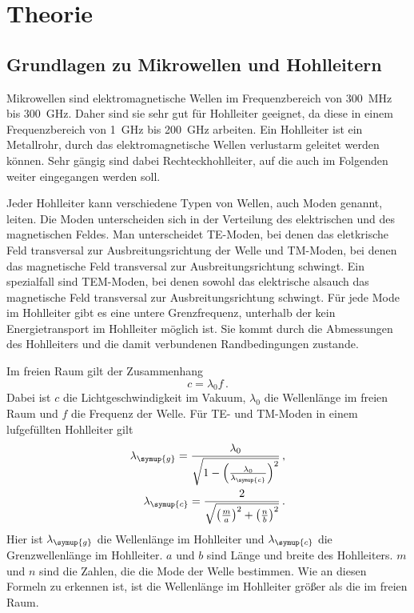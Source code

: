 \section{Theorie}
\label{sec:Theorie}

\subsection{Grundlagen zu Mikrowellen und Hohlleitern}
\label{subsec:grundlagen}
Mikrowellen sind elektromagnetische Wellen im Frequenzbereich von \SI{300}{\mega\Hz}
bis \SI{300}{\giga\Hz}. Daher sind sie sehr gut für Hohlleiter geeignet, da diese in einem
Frequenzbereich von \SI{1}{\giga\Hz} bis \SI{200}{\giga\Hz} arbeiten. Ein Hohlleiter ist
ein Metallrohr, durch das elektromagnetische Wellen verlustarm geleitet werden können.
Sehr gängig sind dabei Rechteckhohlleiter, auf die auch im Folgenden weiter eingegangen
werden soll.

Jeder Hohlleiter kann verschiedene Typen von Wellen, auch Moden genannt, leiten.
Die Moden unterscheiden sich in der Verteilung des elektrischen und des magnetischen
Feldes. Man unterscheidet TE-Moden, bei denen das eletkrische Feld transversal zur
Ausbreitungsrichtung der Welle und TM-Moden, bei denen das magnetische Feld transversal
zur Ausbreitungsrichtung schwingt. Ein spezialfall sind TEM-Moden, bei denen sowohl
das elektrische alsauch das magnetische Feld transversal zur Ausbreitungsrichtung
schwingt. Für jede Mode im Hohlleiter gibt es eine untere Grenzfrequenz, unterhalb
der kein Energietransport im Hohlleiter möglich ist. Sie kommt durch die Abmessungen
des Hohlleiters und die damit verbundenen Randbedingungen zustande.

Im freien Raum gilt der Zusammenhang
\begin{equation}
  c= \lambda_0 f\,.
  \label{eqn:frequenz}
\end{equation}
Dabei ist $c$ die Lichtgeschwindigkeit im Vakuum, $\lambda_0$ die Wellenlänge im
freien Raum und $f$ die Frequenz der Welle.
Für TE- und TM-Moden in einem lufgefüllten Hohlleiter gilt
\begin{align}
  \lambda_{\symup{g}}=\frac{\lambda_0}{\sqrt{1-\left(\frac{\lambda_0}
  {\lambda_{\symup{c}}}\right)^2}} \,, \label{eqn:hohlleiterg}\\
  \lambda_{\symup{c}}=\frac{2}{\sqrt{\left(\frac{m}{a}\right)^2+
  \left(\frac{n}{b}\right)^2}} \,.
  \label{eqn:hohlleiterc}
\end{align}
Hier ist $\lambda_{\symup{g}}$ die Wellenlänge im Hohlleiter und $\lambda_{\symup{c}}$
die Grenzwellenlänge im Hohlleiter. $a$ und $b$ sind Länge und breite des Hohlleiters.
$m$ und $n$ sind die Zahlen, die die Mode der Welle bestimmen.
Wie an diesen Formeln zu erkennen ist, ist die Wellenlänge im Hohlleiter
größer als die im freien Raum.

